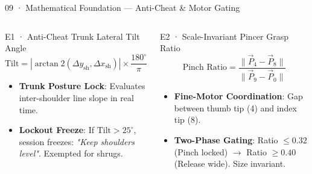 \documentclass[aspectratio=169,11pt]{beamer}
\begin{document}
\begin{frame}{09 · Mathematical Foundation — Anti-Cheat \& Motor Gating}
\begin{columns}[T]
\begin{alertblock}{E1 · Anti-Cheat Trunk Lateral Tilt Angle}
$$\text{Tilt} = \left|\arctan2(\Delta y_{\text{sh}}, \Delta x_{\text{sh}})\right| \times \frac{180^\circ}{\pi}$$
\begin{itemize}
    \setlength{\itemsep}{2pt}
    \item \textbf{Trunk Posture Lock}: Evaluates inter-shoulder line slope in real time.
    \item \textbf{Lockout Freeze}: If $\text{Tilt} > 25^\circ$, session freezes: \textit{"Keep shoulders level"}. Exempted for shrugs.
\end{itemize}
\end{alertblock}

\begin{block}{E2 · Scale-Invariant Pincer Grasp Ratio}
$$\text{Pinch Ratio} = \frac{\|\vec{P}_4 - \vec{P}_8\|}{\|\vec{P}_9 - \vec{P}_0\|}$$
\begin{itemize}
    \setlength{\itemsep}{2pt}
    \item \textbf{Fine-Motor Coordination}: Gap between thumb tip (4) and index tip (8).
    \item \textbf{Two-Phase Gating}: Ratio $\le 0.32$ (Pinch locked) $\rightarrow$ Ratio $\ge 0.40$ (Release wide). Size invariant.
\end{itemize}
\end{block}
\end{columns}
\end{frame}
\end{document}

